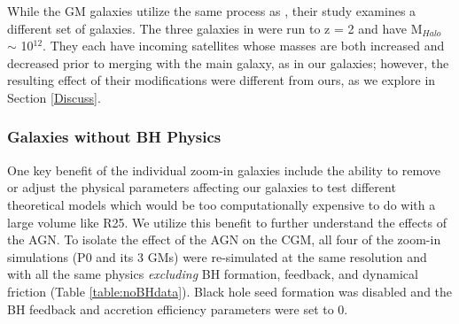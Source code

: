 \documentclass[]{emulateapj}
\begin{document}



While the GM galaxies utilize the same process as \cite{Pontzen2016}, their study examines a different set of galaxies. The three galaxies in \cite{Pontzen2016} were run to z = 2 and have M$_{Halo}$ $\sim$ 10$^{12}$. They each have incoming satellites whose masses are both increased and decreased prior to merging with the main galaxy, as in our galaxies; however, the resulting effect of their modifications were different from ours, as we explore in Section \ref{Discuss}.

\subsubsection{Galaxies without BH Physics}
One key benefit of the individual zoom-in galaxies include the ability to remove or adjust the physical parameters affecting our galaxies to test different theoretical models which would be too computationally expensive to do with a large volume like R25. We utilize this benefit to further understand the effects of the AGN. To isolate the effect of the AGN on the CGM, all four of the zoom-in simulations (P0 and its 3 GMs) were re-simulated at the same resolution and with all the same physics \textit{excluding} BH formation, feedback, and dynamical friction (Table \ref{table:noBHdata}). Black hole seed formation was disabled and the BH feedback and accretion efficiency parameters were set to 0.
\end{document}
